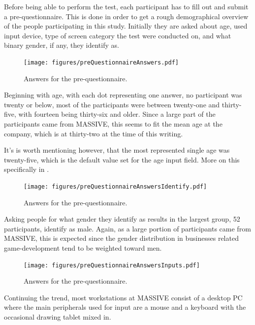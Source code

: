 \documentclass[nofilelist,dvipsnames]{cslthse-msc}
\begin{document}
{        Before being able to perform the test, each participant has to fill
        out and submit a pre-questionnaire. This is done in order to get
        a rough demographical overview of the people participating in this
        study. Initially they are asked about age, used input device, type of
        screen category the test were conducted on, and what binary gender, if
        any, they identify as.

				\begin{figure}[h!]
					\centering
					\texttt{[image: figures/preQuestionnaireAnswers.pdf]}
					\caption{Answers for the pre-questionnaire.}
				\end{figure}

        Beginning with age, with each dot representing one answer, no
        participant was twenty or below, most of the  participants were between
        twenty-one and thirty-five, with fourteen being thirty-six and older.
        Since a large part of the participants came from MASSIVE, this seems to
        fit the mean age at the company, which is at thirty-two{\findref} at
        the time of this writing.

        It's is worth mentioning however, that the most represented single age
        was twenty-five, which is the default value set for the age input
        field. More on this specifically in .

				\begin{figure}[h!]
					\centering
					\texttt{[image: figures/preQuestionnaireAnswersIdentify.pdf]}
					\caption{Answers for the pre-questionnaire.}
				\end{figure}

        Asking people for what gender they identify as results in the largest
        group, 52 participants, identify as male. Again, as a large portion of
        participants came from MASSIVE, this is expected since the gender
        distribution in businesses related game-development tend to be weighted
        toward men\findref\findref.

				\begin{figure}[h!]
					\centering
					\texttt{[image: figures/preQuestionnaireAnswersInputs.pdf]}
					\caption{Answers for the pre-questionnaire.}
				\end{figure}

        Continuing the trend, most workstations at MASSIVE consist of a
        desktop PC where the main peripherals used for input are a mouse and a
        keyboard with the occasional drawing tablet mixed in.

}
\end{document}
